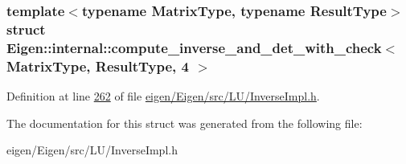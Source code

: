 \subsubsection*{template$<$typename Matrix\+Type, typename Result\+Type$>$\newline
struct Eigen\+::internal\+::compute\+\_\+inverse\+\_\+and\+\_\+det\+\_\+with\+\_\+check$<$ Matrix\+Type, Result\+Type, 4 $>$}



Definition at line \hyperlink{eigen_2_eigen_2src_2_l_u_2_inverse_impl_8h_source_l00262}{262} of file \hyperlink{eigen_2_eigen_2src_2_l_u_2_inverse_impl_8h_source}{eigen/\+Eigen/src/\+L\+U/\+Inverse\+Impl.\+h}.



The documentation for this struct was generated from the following file\+:\begin{DoxyCompactItemize}
\item 
eigen/\+Eigen/src/\+L\+U/\+Inverse\+Impl.\+h\end{DoxyCompactItemize}
